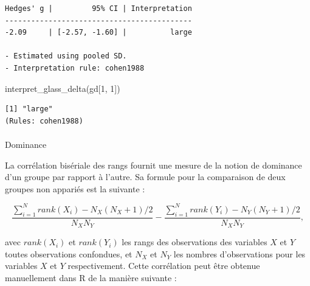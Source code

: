 \documentclass[
  letterpaper,
]{book}
\makeatletter
\let\oldparagraph\paragraph
\renewcommand{\paragraph}{
    \@ifstar
      \xxxParagraphStar
      \xxxParagraphNoStar
  }
\newcommand{\xxxParagraphStar}[1]{\oldparagraph*{#1}\mbox{}}
\newcommand{\xxxParagraphNoStar}[1]{\oldparagraph{#1}\mbox{}}
\newenvironment{Shaded}{\begin{snugshade}}{\end{snugshade}}
\newcommand{\DecValTok}[1]{\textcolor[rgb]{0.68,0.00,0.00}{#1}}
\newcommand{\FunctionTok}[1]{\textcolor[rgb]{0.28,0.35,0.67}{#1}}
\newcommand{\NormalTok}[1]{\textcolor[rgb]{0.00,0.23,0.31}{#1}}
\makeatother
\begin{document}
\begin{verbatim}
Hedges' g |         95% CI | Interpretation
-------------------------------------------
-2.09     | [-2.57, -1.60] |          large

- Estimated using pooled SD.
- Interpretation rule: cohen1988
\end{verbatim}

\begin{Shaded}
\begin{Highlighting}[]
\FunctionTok{interpret\_glass\_delta}\NormalTok{(gd[}\DecValTok{1}\NormalTok{, }\DecValTok{1}\NormalTok{])}
\end{Highlighting}
\end{Shaded}

\begin{verbatim}
[1] "large"
(Rules: cohen1988)
\end{verbatim}

\paragraph{Dominance}\label{dominance-1}

La corrélation bisériale des rangs fournit une mesure de la notion de
dominance d'un groupe par rapport à l'autre. Sa formule pour la
comparaison de deux groupes non appariés est la suivante :

\[
\frac{\sum_{i=1}^{N} rank(X_{i}) - N_{X} (N_{X} + 1) / 2}{N_{X}  N_{Y}} - \frac{\sum_{i=1}^{N} rank(Y_{i}) - N_{Y} (N_{Y} + 1) / 2}{N_{X}  N_{Y}},
\]

avec \(rank(X_{i})\) et \(rank(Y_{i})\) les rangs des observations des
variables \(X\) et \(Y\) toutes observations confondues, et \(N_{X}\) et
\(N_{Y}\) les nombres d'observations pour les variables \(X\) et \(Y\)
respectivement. Cette corrélation peut être obtenue manuellement dans R
de la manière suivante :
\end{document}
